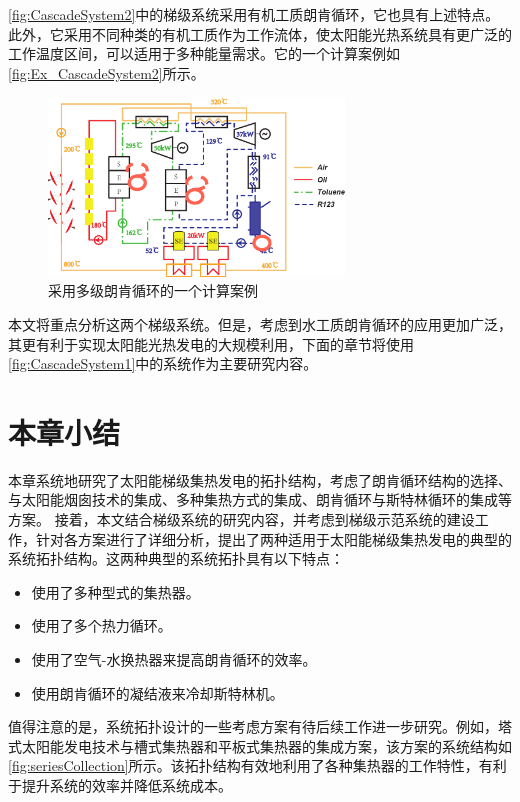 \autoref{fig:CascadeSystem2}中的梯级系统采用有机工质朗肯循环，它也具有上述特点。此外，它采用不同种类的有机工质作为工作流体，使太阳能光热系统具有更广泛的工作温度区间，可以适用于多种能量需求。它的一个计算案例如\autoref{fig:Ex_CascadeSystem2}所示。
\begin{figure}[htbp]
\centering 
\includegraphics[width=0.7\textwidth]{fig/Ex_CascadeSystem2}
\caption{采用多级朗肯循环的一个计算案例}
\label{fig:Ex_CascadeSystem2}
\end{figure}

本文将重点分析这两个梯级系统。但是，考虑到水工质朗肯循环的应用更加广泛，其更有利于实现太阳能光热发电的大规模利用，下面的章节将使用\autoref{fig:CascadeSystem1}中的系统作为主要研究内容。

\newpage
\section{本章小结}
本章系统地研究了太阳能梯级集热发电的拓扑结构，考虑了朗肯循环结构的选择、与太阳能烟囱技术的集成、多种集热方式的集成、朗肯循环与斯特林循环的集成等方案。
接着，本文结合梯级系统的研究内容，并考虑到梯级示范系统的建设工作，针对各方案进行了详细分析，提出了两种适用于太阳能梯级集热发电的典型的系统拓扑结构。这两种典型的系统拓扑具有以下特点：

\begin{itemize}
  \item 使用了多种型式的集热器。
  \item 使用了多个热力循环。
  \item 使用了空气-水换热器来提高朗肯循环的效率。
  \item 使用朗肯循环的凝结液来冷却斯特林机。
\end{itemize}

值得注意的是，系统拓扑设计的一些考虑方案有待后续工作进一步研究。例如，塔式太阳能发电技术与槽式集热器和平板式集热器的集成方案，该方案的系统结构如\autoref{fig:seriesCollection}所示。该拓扑结构有效地利用了各种集热器的工作特性，有利于提升系统的效率并降低系统成本。